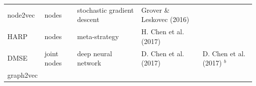 \documentclass[10pt,oneside]{article}
\begin{document}
\begin{longtable}[]{@{}lllll@{}}
\begin{minipage}[t]{0.09\columnwidth}
node2vec\strut
\end{minipage} & \begin{minipage}[t]{0.11\columnwidth}\raggedright
nodes\strut
\end{minipage} & \begin{minipage}[t]{0.23\columnwidth}\raggedright
stochastic gradient descent\strut
\end{minipage} & \begin{minipage}[t]{0.14\columnwidth}\raggedright
Grover \& Leskovec (2016)\strut
\end{minipage} & \begin{minipage}[t]{0.29\columnwidth}\raggedright
\strut
\end{minipage}\tabularnewline
\begin{minipage}[t]{0.09\columnwidth}\raggedright
HARP\strut
\end{minipage} & \begin{minipage}[t]{0.11\columnwidth}\raggedright
nodes\strut
\end{minipage} & \begin{minipage}[t]{0.23\columnwidth}\raggedright
meta-strategy\strut
\end{minipage} & \begin{minipage}[t]{0.14\columnwidth}\raggedright
H. Chen et al. (2017)\strut
\end{minipage} & \begin{minipage}[t]{0.29\columnwidth}\raggedright
\strut
\end{minipage}\tabularnewline
\begin{minipage}[t]{0.09\columnwidth}\raggedright
DMSE\strut
\end{minipage} & \begin{minipage}[t]{0.11\columnwidth}\raggedright
joint nodes\strut
\end{minipage} & \begin{minipage}[t]{0.23\columnwidth}\raggedright
deep neural network\strut
\end{minipage} & \begin{minipage}[t]{0.14\columnwidth}\raggedright
D. Chen et al. (2017)\strut
\end{minipage} & \begin{minipage}[t]{0.29\columnwidth}\raggedright
D. Chen et al. (2017) \(^b\)\strut
\end{minipage}\tabularnewline
\begin{minipage}[t]{0.09\columnwidth}\raggedright
graph2vec\strut
\end{minipage} & \begin{minipage}[t]{0.11\columnwidth}\raggedright

\end{minipage}
\end{longtable}
\end{document}

